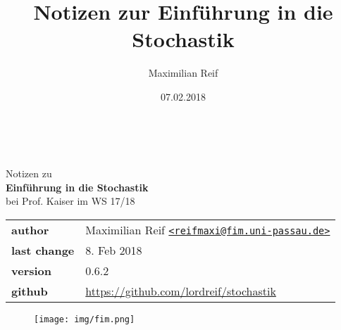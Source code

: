 \documentclass[11pt,a4paper,ngerman]{article}
\date{07.02.2018}
\author{Maximilian Reif}
\title{Notizen zur Einführung in die Stochastik}
\newcommand{\1}{\mathbbm{1}}
\begin{document}
\begin{titlepage}
    \ \newline\newline\newline\newline\newline
	
	\begin{center}

		\huge Notizen zu\\
		\Huge\textbf{Einführung in die Stochastik}\\
		\huge bei Prof. Kaiser im WS 17/18\\
		\normalsize

		\vspace{1cm}
		\begin{tabular}[b]{l|l}
			\textbf{author} 		& Maximilian Reif
			\texttt{\href{mailto:reifmaxi@fim.uni-passau.de}
			{<reifmaxi@fim.uni-passau.de>}}\\
			\textbf{last change}	& 8. Feb 2018 \\
			\textbf{version} 	& 0.6.2\\
			\textbf{github} 		& \url{https://github.com/lordreif/stochastik}
		\end{tabular}
		\vspace{1cm}
		
	\end{center}
	
	\begin{figure}[b]
	\centering
	\texttt{[image: img/fim.png]}
	\end{figure}
	
\end{titlepage}

%

\newpage
\tableofcontents\thispagestyle{empty}
\newpage

\setcounter{page}{1}




%
%

\end{document}
